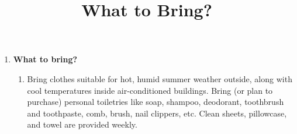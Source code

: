 \documentclass[11pt]{rossasia}
\title{What to Bring?}
\begin{document}
\maketitle
 \begin{enumerate}[label=(\arabic*),itemsep=2em,topsep=-1em]

\item \textbf{What to bring?}
 \begin{enumerate}[label=(\alph*),itemsep=0.5em,topsep=0em]
 \item Bring clothes suitable for hot, humid summer weather 
   outside, along with cool
   temperatures inside air-conditioned buildings.  Bring (or plan to
   purchase) \linebreak personal toiletries like soap, shampoo, deodorant,
   toothbrush and toothpaste, comb, brush, nail clippers, etc.
   Clean sheets, pillowcase, and towel are provided weekly. 


\end{enumerate}
\end{enumerate}
\end{document}
